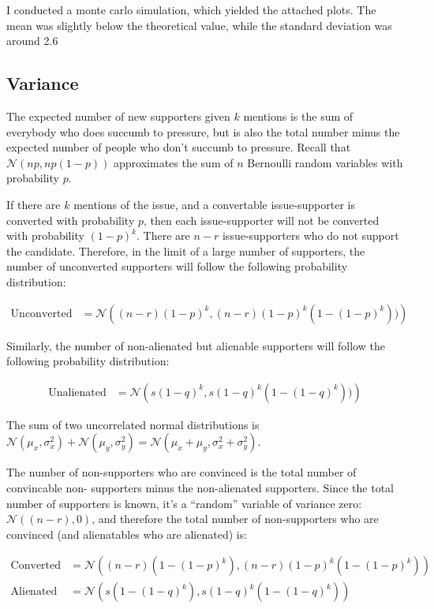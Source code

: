 \documentclass{article}
\begin{document}
I conducted a monte carlo simulation, which yielded the attached plots.
The mean was slightly below the theoretical value, while the standard deviation 
	was around 2.6

\subsection{Variance}

The expected number of new supporters given $k$ mentions is the sum of everybody who
	does succumb to pressure, but is also the total number minus the expected
	number of people who don't succumb to pressure.
Recall that $\mathcal{N}(n p, n p (1 - p))$ approximates the sum of $n$ Bernoulli
	random variables with probability $p$.

If there are $k$ mentions of the issue, and a convertable issue-supporter is converted 
	with probability
	$p$, then each issue-supporter will not be converted with probability $(1 - p)^k$.
There are $n - r$ issue-supporters who do not support the candidate.
Therefore, in the limit of a large number of supporters, the number of unconverted
	supporters will follow the following probability distribution:

\begin{align}
\text{Unconverted} 
	& = \mathcal{N}\left((n-r)(1-p)^k, (n-r)(1-p)^k(1-(1-p)^k))\right)
\end{align}

Similarly, the number of non-alienated but alienable supporters will follow the
	following probability distribution:

\begin{align}
\text{Unalienated}
	& = \mathcal{N}\left(s(1-q)^k, s(1-q)^k(1-(1-q)^k))\right)
\end{align}
	
The sum of two uncorrelated normal distributions is 
	$\mathcal{N}(\mu_x, \sigma_x^2) + \mathcal{N}(\mu_y, \sigma_y^2)
		= \mathcal{N}(\mu_x + \mu_y, \sigma_x^2 + \sigma_y^2)$.

The number of non-supporters who are convinced is the total number of convincable non-
	supporters minus
	the non-alienated supporters.
Since the total number of supporters is known, it's a ``random'' variable
	of variance zero: $\mathcal{N}((n - r), 0)$,
	and therefore the total number of non-supporters who are convinced 
	(and alienatables who are alienated) is:

\begin{align}
\text{Converted} 
	& = \mathcal{N} \left( (n-r)(1 - (1 - p)^k), (n - r)(1 - p)^k(1 - (1 - p)^k)\right)\\
\text{Alienated}
	& = \mathcal{N} \left( s(1 - (1 - q)^k), s(1 - q)^k(1 - (1 - q)^k)\right)
\end{align}
\end{document}
